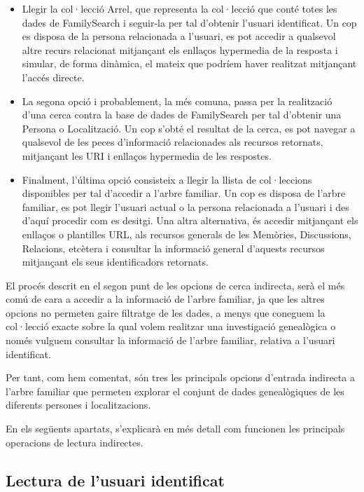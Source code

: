         \begin{itemize}
            \item Llegir la col·lecció Arrel, que representa la col·lecció que conté totes les dades de FamilySearch i seguir-la per tal d'obtenir l'usuari identificat. Un cop es disposa de la persona relacionada a l'usuari, es pot accedir a qualsevol altre recurs relacionat mitjançant els enllaços hypermedia de la resposta i simular, de forma dinàmica, el mateix que podríem haver realitzat mitjançant l'accés directe.
            \item La segona opció i probablement, la més comuna, passa per la realització d'una cerca contra la base de dades de FamilySearch per tal d'obtenir una Persona o Localització. Un cop s'obté el resultat de la cerca, es pot navegar a qualsevol de les peces d'informació relacionades als recursos retornats, mitjançant les URI i enllaços hypermedia de les respostes.
            \item Finalment, l'última opció consisteix a llegir la llista de col·leccions disponibles per tal d'accedir a l'arbre familiar. Un cop es disposa de l'arbre familiar, es pot llegir l'usuari actual o la persona relacionada a l'usuari i des d'aquí procedir com es desitgi. Una altra alternativa, és accedir mitjançant els enllaços o plantilles URL, als recursos generals de les Memòries, Discussions, Relacions, etcètera i consultar la informació general d'aquests recursos mitjançant els seus identificadors retornats.
        \end{itemize}

        El procés descrit en el segon punt de les opcions de cerca indirecta, serà el més comú de cara a accedir a la informació de l'arbre familiar, ja que les altres opcions no permeten gaire filtratge de les dades, a menys que coneguem la col·lecció exacte sobre la qual volem realitzar una investigació genealògica o només vulguem consultar la informació de l'arbre familiar, relativa a l'usuari identificat.

        Per tant, com hem comentat, són tres les principals opcions d'entrada indirecta a l'arbre familiar que permeten explorar el conjunt de dades genealògiques de les diferents persones i localitzacions.

        En els següents apartats, s'explicarà en més detall com funcionen les principals operacions de lectura indirectes.


    \subsection{Lectura de l'usuari identificat}

